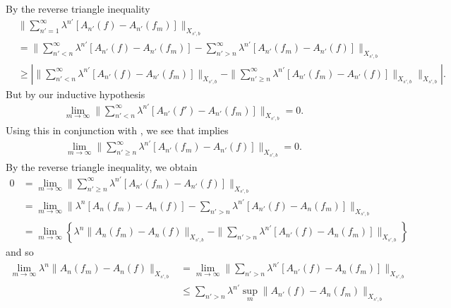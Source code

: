 \documentclass[12pt,reqno]{amsart}
\numberwithin{equation}{section}  %
\renewcommand{\cref}{\Cref}
\begin{document}
%
%
By the reverse triangle inequality
%
%
\begin{equation}
\begin{split}
  & \| \sum_{n'=1}^{\infty} \lambda^{n'}\left[ A_{n'}(f) - A_{n'}(f_{m}) \right]
  \|_{X_{s',b}}
  \\
  & = \| \sum_{n' < n}^{\infty} \lambda^{n'}\left[ A_{n'}(f) -
  A_{n'}(f_{m}) \right] - \sum_{n' > n}^{\infty} \lambda^{n'}\left[
  A_{n'}(f_{m}) - A_{n'}(f)
  \right] \|_{X_{s',b}}
  \\
  & \ge |\| \sum_{n' < n}^{\infty} \lambda^{n'}\left[ A_{n'}(f) -
  A_{n'}(f_{m}) \right] \|_{X_{s',b}} -
  \| \sum_{n' \ge n}^{\infty} \lambda^{n'}\left[ A_{n'}(f_{m}) -
  A_{n'}(f) \right] \|_{X_{s',b}} \|_{X_{s',b}} |.
\end{split}
\label{2bh}
\end{equation}
%
%
But by our inductive hypothesis
%
%
\begin{equation*}
\begin{split}
  \lim_{m \to \infty} \| \sum_{n'<n}^{\infty} \lambda^{n'} \left[
  A_{n'}(f') - A_{n'}(f_{m})
  \right] \|_{X_{s',b}} = 0.
\end{split}
\end{equation*}
%
%
Using this in conjunction with \cref{1bh}, we see that \cref{2bh} implies
%
%
\begin{equation*}
\begin{split}
  \lim_{m \to \infty} \| \sum_{n' \ge n}^{\infty} \lambda^{n'} \left[
  A_{n'}(f_{m}) - A_{n'}(f)
  \right] \|_{X_{s',b}} = 0.
\end{split}
\end{equation*}
%
%
By the reverse triangle inequality, we obtain
%
%
%
\begin{equation*}
\begin{split}
0 & = \lim_{m \to \infty} \| \sum_{n' \ge n}^{\infty} \lambda^{n'} \left[
  A_{n'}(f_{m}) - A_{n'}(f)
  \right] \|_{X_{s',b}}
  \\
  & = \lim_{m \to \infty}  \|\lambda^{n}\left[ A_{n}(f_{m}) - A_{n}(f) \right] -
  \sum_{n' > n} \lambda^{n'} \left[ A_{n'}(f) - A_{n}(f_{m})
  \right]\|_{X_{s',b}}
  \\
  & = \lim_{m \to \infty}
  \left\{ \lambda^{n} \| A_{n}(f_{m}) - A_{n}(f) \|_{X_{s',b}}
   - \| \sum_{n' > n} \lambda^{n'} \left[ A_{n'}(f) - A_{n}(f_{m})
      \right]\|_{X_{s',b}}\right\}
\end{split}
\end{equation*}
%
%
and so
%
%
\begin{equation*}
\begin{split}
  \lim_{m \to \infty} \lambda^{n} \| A_{n}(f_{m}) - A_{n}(f) \|_{X_{s',b}}
  & = \lim_{m \to \infty} \| \sum_{n' > n} \lambda^{n'} \left[ A_{n'}(f) - A_{n}(f_{m})
      \right]\|_{X_{s',b}}
      \\
      & \le  \sum_{n' > n} \lambda^{n'} \sup_{m} \|  A_{n'}(f) - A_{n}(f_{m})
      \|_{X_{s',b}}
\end{split}
\end{equation*}
\end{document}
